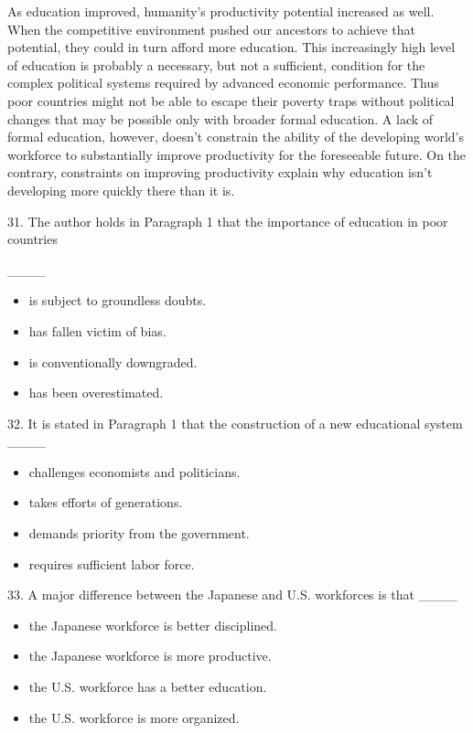 \documentclass[UTF8,11pt]{ctexart}
\begin{document}
As education improved, humanity’s productivity potential increased as well. When the competitive environment pushed our ancestors to achieve that potential, they could in turn afford more education. This increasingly high level of education is probably a necessary, but not a sufficient, condition for the complex political systems required by advanced economic performance. Thus poor countries might not be able to escape their poverty traps without political changes that may be possible only with broader formal education. A lack of formal education, however, doesn’t constrain the ability of the developing world’s workforce to substantially improve productivity for the foreseeable future. On the contrary, constraints on improving productivity explain why education isn’t developing more quickly there than it is.


31. The author holds in Paragraph 1 that the importance of education in poor countries


\_\_\_\_


\begin{itemize}[leftmargin=2em,itemsep=.2em,topsep=.4em]\item[A.] is subject to groundless doubts.
\item[B.] has fallen victim of bias.
\item[C.] is conventionally downgraded.
\item[D.] has been overestimated.
\end{itemize}

32. It is stated in Paragraph 1 that the construction of a new educational system \_\_\_\_


\begin{itemize}[leftmargin=2em,itemsep=.2em,topsep=.4em]\item[A.] challenges economists and politicians.
\item[B.] takes efforts of generations.
\item[C.] demands priority from the government.
\item[D.] requires sufficient labor force.
\end{itemize}

33. A major difference between the Japanese and U.S. workforces is that \_\_\_\_


\begin{itemize}[leftmargin=2em,itemsep=.2em,topsep=.4em]\item[A.] the Japanese workforce is better disciplined.
\item[B.] the Japanese workforce is more productive.
\item[C.] the U.S. workforce has a better education.
\item[D.] the U.S. workforce is more organized.
\end{itemize}
\end{document}
